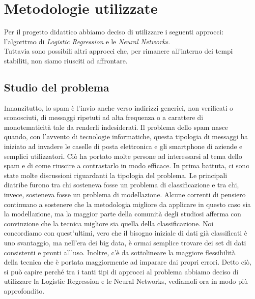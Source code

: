 \section{Metodologie utilizzate}
Per il progetto didattico abbiamo deciso di utilizzare i seguenti approcci: l'algoritmo di \href{https://en.wikipedia.org/wiki/Logistic_regression}{\textit{Logistic Regression}} e le \href{https://en.wikipedia.org/wiki/Neural_network}{\textit{Neural Networks}}.\\
Tuttavia sono possibili altri approcci che, per rimanere all'interno dei tempi stabiliti, non siamo riusciti ad affrontare. 

\subsection{Studio del problema}
Innanzitutto, lo spam è l'invio anche verso indirizzi generici, non verificati o sconosciuti, di messaggi ripetuti ad alta frequenza o a carattere di monotematicità tale da renderli indesiderati. Il problema dello spam nasce quando, con l'avvento di tecnologie informatiche, questa tipologia di messaggi ha iniziato ad invadere le caselle di posta elettronica e gli smartphone di aziende e semplici utilizzatori. Ciò ha portato molte persone ad interessarsi al tema dello spam e di come riuscire a contrastarlo in modo efficace.
\newline
In prima battuta, ci sono state molte discussioni riguardanti la tipologia del problema. Le principali diatribe furono tra chi sosteneva fosse un problema di classificazione e tra chi, invece, sosteneva fosse un problema di modellazione.
Alcune correnti di pensiero continuano a sostenere che la metodologia migliore da applicare in questo caso sia la modellazione, ma la maggior parte della comunità degli studiosi afferma con convinzione che la tecnica migliore sia quella della classificazione. Noi concordiamo con quest'ultimi, vero che il bisogno iniziale di dati già classificati è uno svantaggio, ma nell'era dei big data, è ormai semplice trovare dei set di dati consistenti e pronti all'uso. Inoltre, c'è da sottolineare la maggiore flessibilità della tecnica che è portata maggiormente ad imparare dai propri errori.
\newline
Detto ciò, si può capire perché tra i tanti tipi di approcci al problema abbiamo deciso di utilizzare la Logistic Regression e le Neural Networks, vediamoli ora in modo più approfondito.
